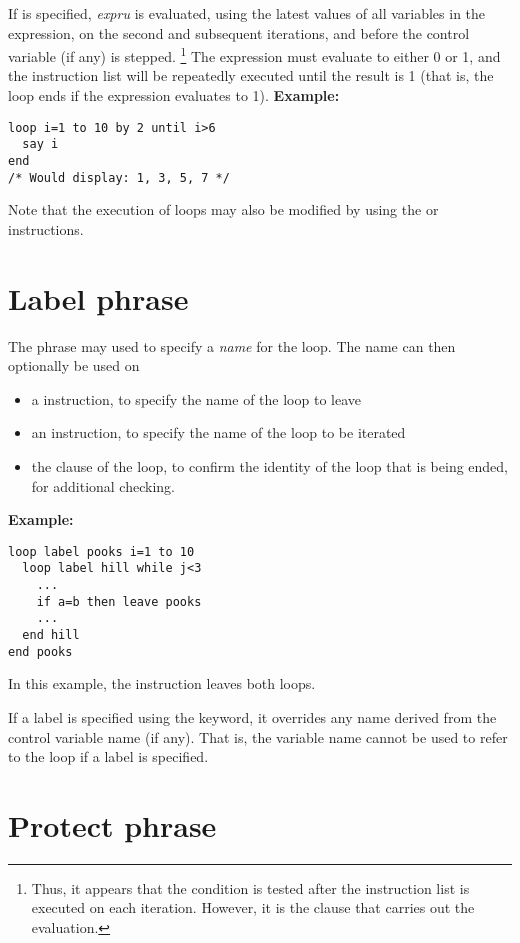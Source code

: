 \begin{description}
If  is specified, \emph{expru} is evaluated, using the
latest values of all variables in the expression, on the second and
subsequent iterations, and before the control variable (if any) is stepped.
\footnote{
Thus, it appears that the  condition is tested after the
instruction list is executed on each iteration.
However, it is the  clause that carries out the evaluation.
}
The expression must evaluate to either 0 or 1, and the instruction list
will be repeatedly executed until the result is 1 (that is, the loop
ends if the expression evaluates to 1).
 \textbf{Example:}
\begin{lstlisting}
loop i=1 to 10 by 2 until i>6
  say i
end
/* Would display: 1, 3, 5, 7 */
\end{lstlisting}
\end{description}
 Note that the execution of loops may also be modified by
using the  or  instructions.
\section{Label phrase}
 
The  phrase may used to specify a \emph{name} for the
loop.  The name can then optionally be used on
\begin{itemize}
\item a  instruction, to specify the name of the loop to leave
\item an  instruction, to specify the name of the loop to
be iterated
\item the  clause of the loop, to confirm the identity of the
loop that is being ended, for additional checking.
\end{itemize}
 \textbf{Example:}
\begin{lstlisting}
loop label pooks i=1 to 10
  loop label hill while j<3
    ...
    if a=b then leave pooks
    ...
  end hill
end pooks
\end{lstlisting}
In this example, the  instruction leaves both loops.
 
If a label is specified using the  keyword, it overrides
any name derived from the control variable name (if any).  That is, the
variable name cannot be used to refer to the loop if a label is
specified.
\section{Protect phrase}
 
